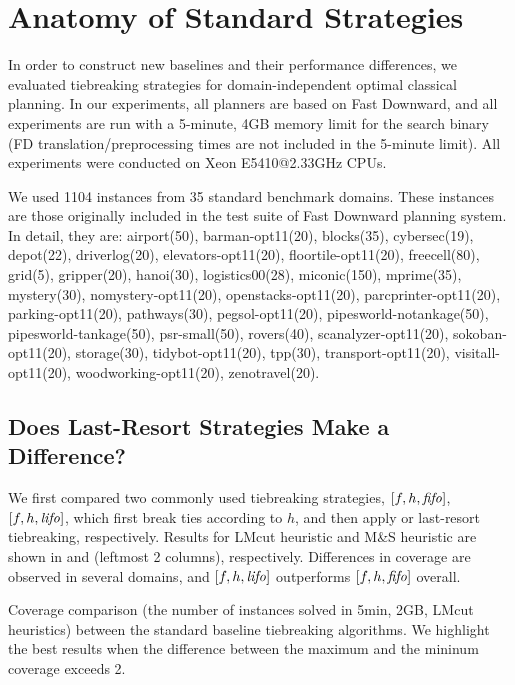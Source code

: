 \section{Anatomy of Standard Strategies}
\label{sec:eval-common-strategies}

In order to construct new baselines and their performance differences,
we evaluated tiebreaking strategies for domain-independent optimal
classical planning.  In our experiments, all planners are based on Fast
Downward, and all experiments are run with a 5-minute,
4GB memory limit for the search binary (FD translation/preprocessing
times are not included in the 5-minute limit).  All experiments were
conducted on Xeon E5410@2.33GHz CPUs. 

We used 1104 instances from 35 standard benchmark domains. These
instances are those originally included in the test suite of Fast
Downward planning system. In detail, they are: airport(50),
barman-opt11(20), blocks(35), cybersec(19), depot(22), driverlog(20),
elevators-opt11(20), floortile-opt11(20), freecell(80), grid(5),
gripper(20), hanoi(30), logistics00(28), miconic(150), mprime(35),
mystery(30), nomystery-opt11(20), openstacks-opt11(20),
parcprinter-opt11(20), parking-opt11(20), pathways(30),
pegsol-opt11(20), pipesworld-notankage(50), pipesworld-tankage(50),
psr-small(50), rovers(40), scanalyzer-opt11(20), sokoban-opt11(20),
storage(30), tidybot-opt11(20), tpp(30), transport-opt11(20),
visitall-opt11(20), woodworking-opt11(20), zenotravel(20).

\subsection{Does Last-Resort Strategies Make a Difference?}

We first compared two commonly used tiebreaking strategies, $[f,h,{\text{\textit{fifo}}}]$, $[f,h,{\text{\textit{lifo}}}]$, which
first break ties according to $h$, and then apply \fifo or \lifo
last-resort tiebreaking, respectively.
Results for LMcut heuristic \cite{Helmert2009} and M\&S heuristic \cite{HelmertHHN14} are
shown in  and 
(leftmost 2 columns), respectively.
Differences in coverage are observed in several domains, and
$[f,h,{\text{\textit{lifo}}}]$ outperforms $[f,h,{\text{\textit{fifo}}}]$ overall.

\begin{table}[htbp]
 {
 \centering
 
 \caption{
 Coverage comparison (the number of instances solved in 5min, 2GB, LMcut
 heuristics) between
 the standard baseline tiebreaking algorithms. We highlight the
 best results when the difference between the maximum and the mininum coverage exceeds 2.
 }
 \label{tbl:lmcut-ipc-full}
 }
\end{table}

